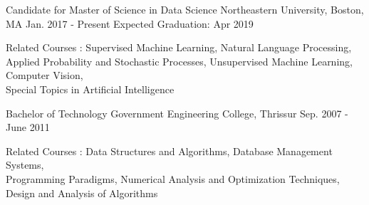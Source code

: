 \vspace{-0.1cm}
\begin{cventries}
  \cventry
    {Candidate for Master of Science in Data Science}
    {Northeastern University, Boston, MA}
    {Jan. 2017 - Present}
    {Expected Graduation: Apr 2019 }
    {
      \begin{cvitems}
      \item {Related Courses : Supervised Machine Learning, Natural Language Processing, \\ Applied Probability and Stochastic Processes, Unsupervised Machine Learning, Computer Vision, \\Special Topics in Artificial Intelligence}
      \end{cvitems}
    }
      \cventry
    {Bachelor of Technology}
    {Government Engineering College, Thrissur}
    {Sep. 2007 - June 2011}
    {}
    {
      \begin{cvitems}
      \item {Related Courses : Data Structures and Algorithms, Database Management Systems, \\
          Programming Paradigms, Numerical Analysis and Optimization Techniques, Design and Analysis of Algorithms}
      \end{cvitems}
    }
\end{cventries}

